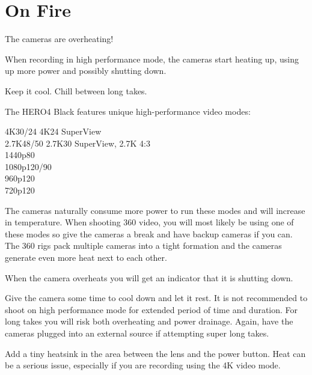 \section{On Fire}
\pagecolor{white}
\label{chap:19}
\begin{fullwidth}

\problem

{\large The cameras are overheating! \par}

When recording in high performance mode, the cameras start heating up, using up more power and possibly shutting down. 


\solution

{\large Keep it cool. Chill between long takes. \par}

The HERO4 Black features unique high-performance video modes: 

4K30/24 4K24 SuperView
\\
2.7K48/50 2.7K30 SuperView, 2.7K 4:3 
\\
1440p80 
\\
1080p120/90 
\\
960p120 
\\
720p120

The cameras naturally consume more power to run these modes and will increase in temperature. When shooting 360 video, you will most likely be using one of these modes so give the cameras a break and have backup cameras if you can. The 360 rigs pack multiple cameras into a tight formation and the cameras generate even more heat next to each other. 

\clearpage
When the camera overheats you will get an indicator that it is shutting down.

                 
Give the camera some time to cool down and let it rest. It is not recommended to shoot on high performance mode for extended period of time and duration. For long takes you will risk both overheating and power drainage. Again, have the cameras plugged into an external source if attempting super long takes. 

\tip Add a tiny heatsink in the area between the lens and the power button. Heat can be a serious issue, especially if you are recording using the 4K video mode.






\clearpage
\end{fullwidth}

